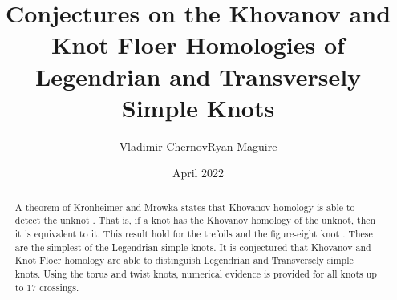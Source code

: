 \documentclass{article}
\title{Conjectures on the Khovanov and Knot Floer Homologies of
       Legendrian and Transversely Simple Knots}
\author{Vladimir Chernov\hspace{2em}Ryan Maguire}
\date{April 2022}
\theoremstyle{plain}
\begin{document}
    \maketitle
    \tableofcontents
    \begin{abstract}
        \noindent
        A theorem of Kronheimer and Mrowka states that Khovanov homology is
        able to detect the unknot \cite{kronheimermrowka2010}.
        That is, if a knot has the Khovanov homology of the unknot, then it is
        equivalent to it. This result hold for the trefoils
        \cite{BaldwinSivekKhovanovTrefoils} and the figure-eight knot
        \cite{BaldwinDowlinKhovanovFigureEight}. These are the
        simplest of the Legendrian simple knots. It is conjectured that
        Khovanov and Knot Floer homology are able to distinguish Legendrian
        and Transversely simple knots. Using the torus and twist knots,
        numerical evidence is provided for all knots up to 17 crossings.
    \end{abstract}
\end{document}
